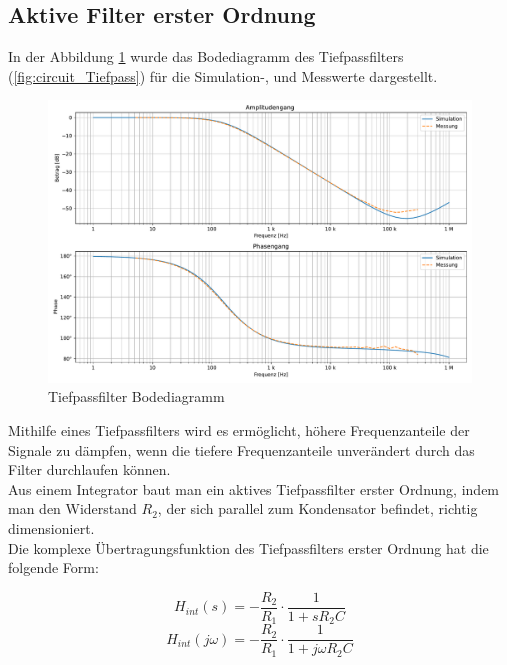  


 



%
\subsection{Aktive Filter erster Ordnung}


In der Abbildung \ref{fig:Tiefpassfilter_Bodediagramm} wurde das Bodediagramm des Tiefpassfilters (\ref{fig:circuit_Tiefpass}) für die Simulation-, und Messwerte dargestellt.

\begin{figure}[H]
  \centering  \includegraphics[width=0.8\linewidth]{Elektronik-Laborprotokoll_Filter/Plots/Tiefpass_Bodediagramm_Simulation_mit_Messung.pdf}
  \caption{Tiefpassfilter Bodediagramm}
  \label{fig:Tiefpassfilter_Bodediagramm}
\end{figure}

Mithilfe eines Tiefpassfilters wird es ermöglicht, höhere Frequenzanteile der Signale zu dämpfen, wenn die tiefere Frequenzanteile unverändert durch das Filter durchlaufen können.\\
%
Aus einem Integrator baut man ein aktives Tiefpassfilter erster Ordnung, indem man den Widerstand $R_2$, der sich parallel zum Kondensator befindet, richtig dimensioniert.\\
%
Die komplexe Übertragungsfunktion des Tiefpassfilters erster Ordnung hat die folgende Form:

\begin{equation*}
    H_{int}(s)=-\frac{R_2}{R_1}\cdot\frac{1}{1+sR_2C} 
\end{equation*}
\begin{equation}
\label{eq:Übertragung_Filter}
   H_{int}(j\omega)=-\frac{R_2}{R_1}\cdot\frac{1}{1+j\omega R_2C} 
\end{equation}

